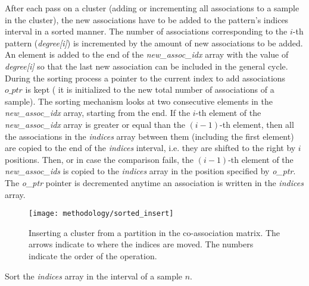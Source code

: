 After each pass on a cluster (adding or incrementing all associations to a sample in the cluster), the new associations have to be added to the pattern's indices interval in a sorted manner.
The number of associations corresponding to the $i$-th pattern (\emph{degree[i]}) is incremented by the amount of new associations to be added.
An element is added to the end of the \emph{new\_assoc\_idx} array with the value of \emph{degree[i]} so that the last new association can be included in the general cycle.
During the sorting process a pointer to the current index to add associations $o\_ptr$ is kept ( it is initialized to the new total number of associations of a sample).
The sorting mechanism looks at two consecutive elements in the \emph{new\_assoc\_idx} array, starting from the end.
If the $i$-th element of the \emph{new\_assoc\_idx} array is greater or equal than the $(i-1)$-th element, then all the associations in the \emph{indices} array between them (including the first element) are copied to the end of the \emph{indices} interval, i.e. they are shifted to the right by $i$ positions.
Then, or in case the comparison fails, the $(i-1)$-th element of the \emph{new\_assoc\_ids} is copied to the \emph{indices} array in the position specified by \emph{o\_ptr}.
The \emph{o\_ptr} pointer is decremented anytime an association is written in the \emph{indices} array.


\begin{figure}[hbtp]
\centering
\texttt{[image: methodology/sorted\_insert]}
\caption{Inserting a cluster from a partition in the co-association matrix. The arrows indicate to where the indices are moved. The numbers indicate the order of the operation.}
\label{fig:normal part}
\end{figure}



\begin{algorithm}
\caption{Sort the \emph{indices} array in the interval of a sample $n$.}\label{alg:eac csr sort cluster}
\begin{algorithmic}[1]

    \EndWhile
\EndWhile

\EndProcedure
\end{algorithmic}
\end{algorithm}

